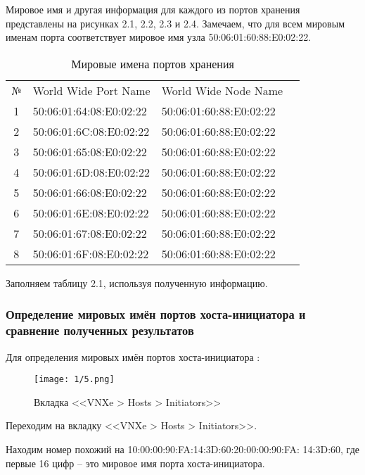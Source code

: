Мировое имя и другая информация для каждого из портов хранения представлены на
рисунках 2.1, 2.2, 2.3 и 2.4. Замечаем, что для всем мировым именам порта
соответствует мировое имя узла 50:06:01:60:88:E0:02:22.

\begin{table}[ht]
    \caption{Мировые имена портов хранения}
    \begin{tabular} {|c|l|l|l|}\cline{1-3}
        № & World Wide Port Name    & World Wide Node Name    \\\cline{1-3}
        1 & 50:06:01:64:08:E0:02:22 & 50:06:01:60:88:E0:02:22 \\\cline{1-3}
        2 & 50:06:01:6C:08:E0:02:22 & 50:06:01:60:88:E0:02:22 \\\cline{1-3}
        3 & 50:06:01:65:08:E0:02:22 & 50:06:01:60:88:E0:02:22 \\\cline{1-3}
        4 & 50:06:01:6D:08:E0:02:22 & 50:06:01:60:88:E0:02:22 \\\cline{1-3}
        5 & 50:06:01:66:08:E0:02:22 & 50:06:01:60:88:E0:02:22 \\\cline{1-3}
        6 & 50:06:01:6E:08:E0:02:22 & 50:06:01:60:88:E0:02:22 \\\cline{1-3}
        7 & 50:06:01:67:08:E0:02:22 & 50:06:01:60:88:E0:02:22 \\\cline{1-3}
        8 & 50:06:01:6F:08:E0:02:22 & 50:06:01:60:88:E0:02:22 \\\cline{1-3}
    \end{tabular}
\end{table}

Заполняем таблицу 2.1, используя полученную информацию.

\subsubsection{Определение мировых имён портов хоста-инициатора и сравнение
    полученных результатов}

Для определения мировых имён портов хоста-инициатора \doing:

\begin{figure}[ht]
    \centering\texttt{[image: 1/5.png]}
    \caption{Вкладка <<VNXe > Hosts > Initiators>>}
\end{figure}

\begin{enumerate_num}
    \item Переходим на вкладку <<VNXe > Hosts > Initiators>>.
    \item Находим номер похожий на 10:00:00:90:FA:14:3D:60:20:00:00:90:FA:
    14:3D:60, где первые 16 цифр -- это мировое имя порта хоста-инициатора.
\end{enumerate_num}

